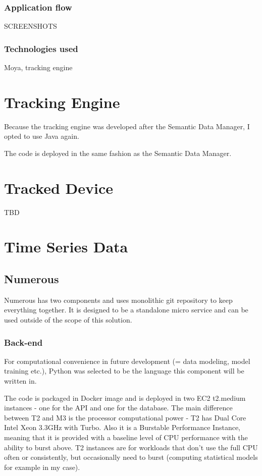 \subsubsection{Application flow}

SCREENSHOTS

\subsubsection{Technologies used}

Moya, tracking engine

\section{Tracking Engine}

Because the tracking engine was developed after the Semantic Data Manager, I opted to use Java again. 

The code is deployed in the same fashion as the Semantic Data Manager.

\section{Tracked Device}
TBD

\section{Time Series Data}

\subsection{Numerous}
Numerous has two components and uses monolithic git repository to keep everything together. It is designed to be a standalone micro service and can be used outside of the scope of this solution.

\subsubsection{Back-end}
For computational convenience in future development (= data modeling, model training etc.), Python was selected to be the language this component will be written in.

The code is packaged in Docker image and is deployed in two EC2 t2.medium instances - one for the API and one for the database. The main difference between T2 and M3 is the processor computational power - T2 has Dual Core Intel Xeon 3.3GHz with Turbo. Also it is a Burstable Performance Instance, meaning that it is provided with a baseline level of CPU performance with the ability to burst above. T2 instances are for workloads that don't use the full CPU often or consistently, but occasionally need to burst (computing statistical models for example in my case).

